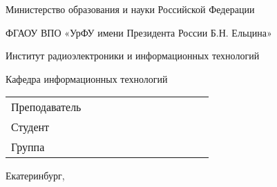 \begin{titlepage}
	\centering
	Министерство образования и науки Российской Федерации
	
	ФГАОУ ВПО «УрФУ имени Президента России Б.Н. Ельцина»
	
	Институт радиоэлектроники и информационных технологий	
	
	Кафедра информационных технологий
	\vspace*{15em plus .6em minus .5em}
	
	{\LARGE \textsc{\textbf{\theTitleWork}}}
		 	
	\theSubTitle
	\vspace*{8em plus .6em minus .5em}
	
	\begin{tabular}[b]{p{0.4\linewidth} p{0.4\linewidth}}
		Преподаватель & \raggedleft{\theTeacher} \arraybackslash\\
		Студент & \raggedleft{\theStudentOne} \arraybackslash\\
		Группа & \raggedleft{\theGroup} \arraybackslash\\	
	\end{tabular}
	
 	\begin{table}[!b]
 		\centering Екатеринбург, \the\year
 	\end{table}
\end{titlepage}